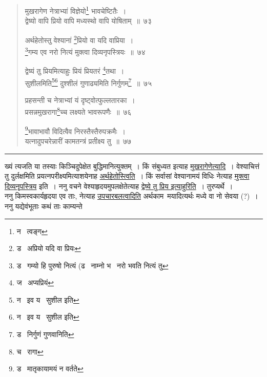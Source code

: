 \documentclass[11pt, openany]{book}
\begin{document}
\begin{quote}
{\na मुखरागेण नेत्राभ्यां विज्ञेयो\renewcommand{\thefootnote}{1}\footnote{न \textendash\  त्वङ्ग} भावचेष्टितैः~।\\
द्वेष्यो वापि प्रियो वापि मध्यस्थो वापि योषिताम्~॥~७३

अर्थहेतोस्तु वेश्यानां \renewcommand{\thefootnote}{2}\footnote{ड \textendash\  अप्रियो यदि वा प्रियः}प्रियो वा यदि वाप्रिया~।\\
\renewcommand{\thefootnote}{3}\footnote{ड \textendash\  गम्यो हि पुरुषो नित्यं (ढ \textendash\  नाम्नो भ \textendash\  नरो भवति नित्यं तु}गम्य एव नरो नित्यं मुक्त्वा दिव्यनृपस्त्रियः~॥~७४

द्वेष्यं तु प्रियमित्याहुः प्रियं प्रियतरं \renewcommand{\thefootnote}{4}\footnote{ज \textendash\  अप्यप्रियं}तथा~।\\
सुशीलमिति\renewcommand{\thefootnote}{5}\footnote{न \textendash\  इव य \textendash\  सुशील इति}\renewcommand{\thefootnote}{5}\footnote{न \textendash\  इव य \textendash\  सुशील इति} दुश्शीलं गुणाढ्यमिति निर्गुणम्\renewcommand{\thefootnote}{6}\footnote{ड \textendash\  निर्गुणं गुणवानिति}~॥~७५

प्रहसन्ती च नेत्राभ्यां यं दृष्ट्वोत्फुल्लतारका~।\\
प्रसन्नमुखरागा\renewcommand{\thefootnote}{7}\footnote{च \textendash\  रागा}च्च लक्ष्यते भावरूपणैः~॥~७६ 

\renewcommand{\thefootnote}{8}\footnote{ड \textendash\  मातृकायामयं न वर्तते}भावाभावौ विदित्वैव निरस्तैस्तैरुपक्रमैः~।\\
यत्नादुपचरेन्नारीं कामतन्त्रं प्रतीक्ष्य तु~॥~७७}
\end{quote}

\hrule

\vspace{2mm}
\noindent
ख्यं त्यजति या तस्याः किञ्चिदुपेक्षेत बुद्धिमानित्युक्तम्~। किं संबुध्यत इत्याह \underline{मुखरागेणेत्यादि}~। वेश्याचित्तं तु दुर्लक्षमिति प्रयत्नपरीक्ष्यमित्याशयेनाह \underline{अर्थहेतोस्त्विति}~। किं सर्वासां वेश्यानामयं विधिः नेत्याह \underline{मुक्त्वा दिव्यनृपस्त्रिय} इति~। ननु वचने वेश्याहृदयमुपलक्षेतेत्याह \underline{द्वेष्ये तु प्रिय इत्याहुरिति}~। तुरप्यर्थे~।\\

ननु किमस्वकार्यहृदया एव ताः, नेत्याह \underline{उपचारबलत्वादिति} अर्थकाम\textendash\ मयादित्यर्थः मध्ये वा नो सेवया (?)~। ननु यद्येवंभूताः कथं ताः काम्यन्ते

\newpage
\end{document}
